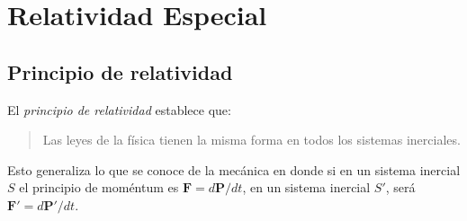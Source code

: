 
\chapter{Relatividad Especial}
\label{cha:relatividad-especial}
\section{Principio de relatividad}
\begin{frame}
El \emph{principio de relatividad} establece que:
\begin{quote}
  Las leyes de la física tienen la misma forma en todos los sistemas inerciales. 
\end{quote}
Esto generaliza lo que se conoce de la mecánica en donde si en un sistema inercial $S$ el principio de moméntum  es $\mathbf{F}=d\mathbf{P}/dt$, en un sistema inercial $S'$, será $\mathbf{F}'=d\mathbf{P}'/dt$.
\end{frame}
